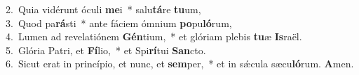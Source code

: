 {2.~}Quia vidérunt óculi \textbf{me}i~* salu\textbf{tá}re \textbf{tu}um,\\
{3.~}Quod pa\textbf{rá}sti~* ante fáciem ómnium \textbf{po}pu\textbf{ló}rum,\\
{4.~}Lumen ad revelatiónem \textbf{Gén}tium,~* et glóriam plebis \textbf{tu}æ \textbf{Is}raël.\\
{5.~}Glória Patri, et \textbf{Fí}lio,~* et Spi\textbf{rí}tui \textbf{San}cto.\\
{6.~}Sicut erat in princípio, et nunc, et \textbf{sem}per,~* et in sǽcula sæcu\textbf{ló}rum. \textbf{A}men.\\
